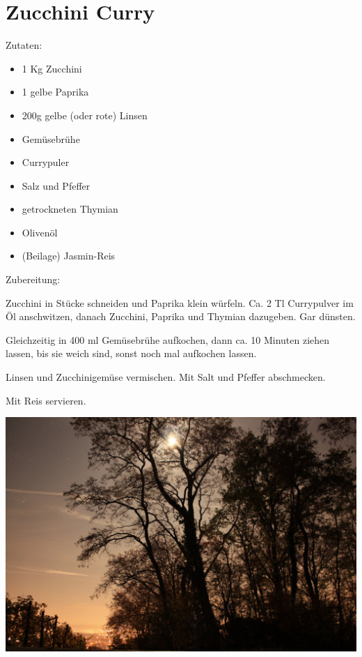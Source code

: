 \section{Zucchini Curry}
Zutaten:
\begin{itemize}
    \item 1 Kg Zucchini
    \item 1 gelbe Paprika
    \item 200g gelbe (oder rote) Linsen
    \item Gemüsebrühe
    \item Currypuler
    \item Salz und Pfeffer
    \item getrockneten Thymian
    \item Olivenöl
    \item (Beilage) Jasmin-Reis
\end{itemize}

\noindent Zubereitung:

\noindent Zucchini in Stücke schneiden und Paprika klein würfeln. Ca. 2 Tl
Currypulver im Öl anschwitzen, danach Zucchini, Paprika und Thymian dazugeben.
Gar dünsten.

Gleichzeitig in 400 ml Gemüsebrühe aufkochen, dann ca. 10 Minuten ziehen
lassen, bis sie weich sind, sonst noch mal aufkochen lassen.

Linsen und Zucchinigemüse vermischen. Mit Salt und Pfeffer abschmecken.

Mit Reis servieren.
\newpage
\mbox{}
\vfill
\begin{center}
    \includegraphics[width=\textwidth]{Zucchini-Curry/IMG_5831._small.jpg}
\end{center}
\vfill
\mbox{ }
\newpage
